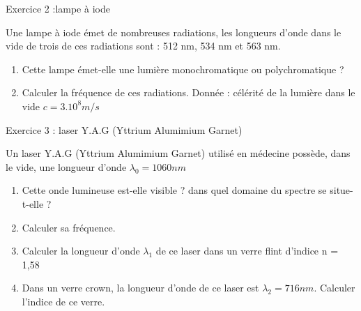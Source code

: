 \documentclass[12pt, french]{article}
\begin{document}
\begin{Box2}{Exercice 2 :lampe à iode  }

Une lampe à iode émet de nombreuses radiations, les longueurs d’onde dans le vide de trois de ces
radiations sont : 512 nm, 534 nm et 563 nm.
\begin{enumerate}
	\item  Cette lampe émet-elle une lumière monochromatique ou polychromatique ?
	\item  Calculer la fréquence de ces radiations.
		Donnée : célérité de la lumière dans le vide $c=3.10^8 m/s$
\end{enumerate}

\end{Box2}

\begin{Box2}{Exercice 3 : laser Y.A.G (Yttrium Alumimium Garnet)}

Un laser Y.A.G (Yttrium Alumimium Garnet) utilisé en médecine possède, dans le vide, une longueur
d’onde $\lambda_0 = 1060 nm$
\begin{enumerate}
\item Cette onde lumineuse est-elle visible ? dans quel domaine du spectre se situe-t-elle ?
\item  Calculer sa fréquence.
\item  Calculer la longueur d’onde $\lambda_1$ de ce laser dans un verre flint d’indice n = 1,58
\item Dans un verre crown, la longueur d’onde de ce laser est $\lambda_2 =716 nm$. Calculer l’indice de ce verre.
\end{enumerate}
\end{Box2}
\end{document}
